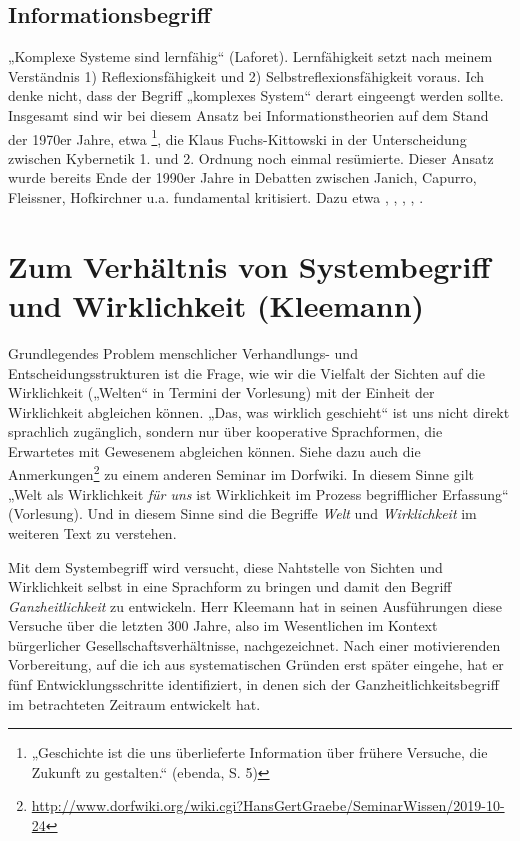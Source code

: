 \documentclass[11pt,a4paper]{article}
\begin{document}
\subsection{Informationsbegriff}

„Komplexe Systeme sind lernfähig“ (Laforet). Lernfähigkeit setzt nach meinem
Verständnis 1) Reflexionsfähigkeit und 2) Selbstreflexionsfähigkeit voraus.
Ich denke nicht, dass der Begriff „komplexes System“ derart eingeengt werden
sollte.  Insgesamt sind wir bei diesem Ansatz bei Informationstheorien auf dem
Stand der 1970er Jahre, etwa \cite{Steinbuch1969}\footnote{„Geschichte ist die
  uns überlieferte Information über frühere Versuche, die Zukunft zu
  gestalten.“ (ebenda, S. 5)}, die Klaus Fuchs-Kittowski \cite{KFK2002} in der
Unterscheidung zwischen Kybernetik 1. und 2. Ordnung noch einmal resümierte.
Dieser Ansatz wurde bereits Ende der 1990er Jahre in Debatten zwischen Janich,
Capurro, Fleissner, Hofkirchner u.a. fundamental kritisiert. Dazu etwa
\cite{Janich2006}, \cite{Capurro1996}, \cite{Capurro1998}, \cite{Capurro2002},
\cite{Klemm2003}.

\section{Zum Verhältnis von Systembegriff und Wirklichkeit (Kleemann)}

Grundlegendes Problem menschlicher Verhandlungs- und Entscheidungsstrukturen
ist die Frage, wie wir die Vielfalt der Sichten auf die Wirklichkeit („Welten“
in Termini der Vorlesung) mit der Einheit der Wirklichkeit abgleichen
können. „Das, was wirklich geschieht“ ist uns nicht direkt sprachlich
zugänglich, sondern nur über kooperative Sprachformen, die Erwartetes mit
Gewesenem abgleichen können. Siehe dazu auch die
Anmerkungen\footnote{\url{http://www.dorfwiki.org/wiki.cgi?HansGertGraebe/SeminarWissen/2019-10-24}}
zu einem anderen Seminar im Dorfwiki. In diesem Sinne gilt „Welt als
Wirklichkeit \emph{für uns} ist Wirklichkeit im Prozess begriff\-licher
Erfassung“ (Vorlesung). Und in diesem Sinne sind die Begriffe \emph{Welt} und
\emph{Wirklichkeit} im weiteren Text zu verstehen.

Mit dem Systembegriff wird versucht, diese Nahtstelle von Sichten und
Wirklichkeit selbst in eine Sprachform zu bringen und damit den Begriff
\emph{Ganzheitlichkeit} zu entwickeln. Herr Kleemann hat in seinen
Ausführungen diese Versuche über die letzten 300 Jahre, also im Wesentlichen
im Kontext bürgerlicher Gesellschaftsverhältnisse, nachgezeichnet. Nach einer
motivierenden Vorbereitung, auf die ich aus systematischen Gründen erst später
eingehe, hat er fünf Entwicklungsschritte identifiziert, in denen sich der
Ganzheitlichkeitsbegriff im betrachteten Zeitraum entwickelt hat.
\end{document}
